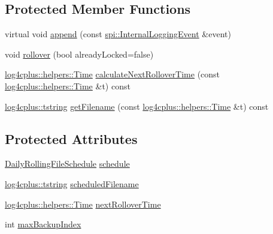 \subsection*{Protected Member Functions}
\begin{DoxyCompactItemize}
\item 
virtual void \hyperlink{classlog4cplus_1_1DailyRollingFileAppender_a6d61c3b82eb60068ae77696c6a3bb7ec}{append} (const \hyperlink{classlog4cplus_1_1spi_1_1InternalLoggingEvent}{spi\-::\-Internal\-Logging\-Event} \&event)
\item 
void \hyperlink{classlog4cplus_1_1DailyRollingFileAppender_a0b24c164ca29eecbb836427bf01ef655}{rollover} (bool already\-Locked=false)
\item 
\hyperlink{namespacelog4cplus_1_1helpers_af05d40c37e1cccf9d11d0cbb7426bcd4}{log4cplus\-::helpers\-::\-Time} \hyperlink{classlog4cplus_1_1DailyRollingFileAppender_a3712d58aa4df52e7f839faae0b6e4655}{calculate\-Next\-Rollover\-Time} (const \hyperlink{namespacelog4cplus_1_1helpers_af05d40c37e1cccf9d11d0cbb7426bcd4}{log4cplus\-::helpers\-::\-Time} \&t) const 
\item 
\hyperlink{namespacelog4cplus_a3c9287f6ebcddc50355e29d71152117b}{log4cplus\-::tstring} \hyperlink{classlog4cplus_1_1DailyRollingFileAppender_a524d5db42fd75e03ea349aa4c172f418}{get\-Filename} (const \hyperlink{namespacelog4cplus_1_1helpers_af05d40c37e1cccf9d11d0cbb7426bcd4}{log4cplus\-::helpers\-::\-Time} \&t) const 
\end{DoxyCompactItemize}
\subsection*{Protected Attributes}
\begin{DoxyCompactItemize}
\item 
\hyperlink{namespacelog4cplus_a8e28400490e25b19a04113f211de4c8f}{Daily\-Rolling\-File\-Schedule} \hyperlink{classlog4cplus_1_1DailyRollingFileAppender_abafd4df2e5d44b4c92f6b7e403946217}{schedule}
\item 
\hyperlink{namespacelog4cplus_a3c9287f6ebcddc50355e29d71152117b}{log4cplus\-::tstring} \hyperlink{classlog4cplus_1_1DailyRollingFileAppender_ad29319815bc3795962df15aa7aebe1a0}{scheduled\-Filename}
\item 
\hyperlink{namespacelog4cplus_1_1helpers_af05d40c37e1cccf9d11d0cbb7426bcd4}{log4cplus\-::helpers\-::\-Time} \hyperlink{classlog4cplus_1_1DailyRollingFileAppender_abc7c4f4cfd9c9a7ea9db92c452f34ec7}{next\-Rollover\-Time}
\item 
int \hyperlink{classlog4cplus_1_1DailyRollingFileAppender_adca7446589f15917965d3224fa0eda93}{max\-Backup\-Index}
\end{DoxyCompactItemize}

